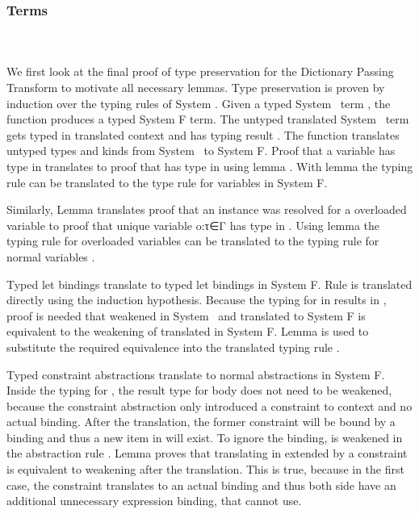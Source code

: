 \subsubsection{Terms}\hfill\\\\
We first look at the final proof of type preservation for the Dictionary Passing Transform to motivate all necessary lemmas. 
Type preservation is proven by induction over the typing rules of System \Fo. 
Given a typed System \Fo\ term , the function  produces a typed System F term. 
The untyped translated System \Fo\ term   gets typed in translated context   and has typing result  . 
The function  translates untyped types and kinds from System \Fo\ to System F.
\DPTTermPres
Proof  that a variable  has type  in  translates to proof that   has type   in   using lemma . 
With lemma  the typing rule  can be translated to the type rule for variables in System F. 

\noindent Similarly, Lemma  translates proof that an instance  \Constr{:}  was resolved for a overloaded variable  to proof that unique variable  {o:τ∈Γ} has type   in  .  
Using lemma  the typing rule for overloaded variables  can be translated to the typing rule for normal variables .

\noindent Typed let bindings    translate to typed let bindings in System F. 
Rule  is translated directly using the induction hypothesis. 
Because the typing for  in  results in  , proof is needed that  weakened in System \Fo\ and translated to System F is equivalent to the weakening of translated  in System F. 
Lemma  is used to substitute the required equivalence into the translated typing rule  .

\noindent Typed constraint abstractions  translate to normal abstractions in System F.
Inside the typing for , the result type  for body  does not need to be weakened, because the constraint abstraction only introduced a constraint to context  and no actual binding. 
After the translation, the former constraint will be bound by a binding and thus a new item in   will exist. To ignore the binding,  is weakened in the abstraction rule .
Lemma  proves that translating  in  extended by a constraint is equivalent to weakening  after the translation. 
This is true, because in the first case, the constraint translates to an actual binding and thus both side have an additional unnecessary expression binding, that  cannot use.

